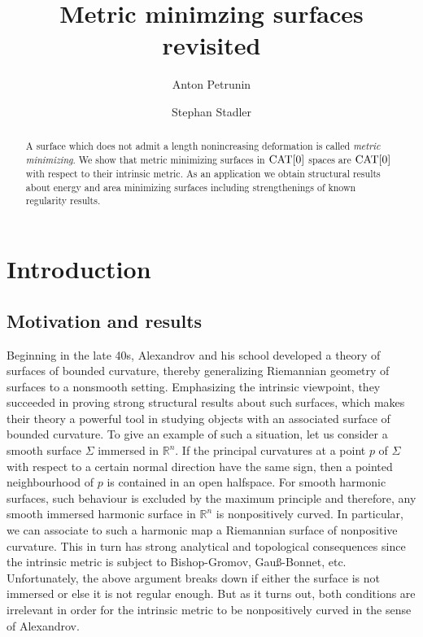 \documentclass[a4paper,10pt]{amsart}
\begin{document}
\title{Metric minimzing surfaces revisited}
\author{Anton Petrunin}
\address{A. Petrunin\newline\vskip-4mm
Math. Dept. PSU,
University Park, PA 16802,
USA}
\author{Stephan Stadler}
\address{S. Stadler\newline\vskip-4mm
Math. Inst.,
Universit\"at M\"unchen, Theresienstr. 39, D-80333 M\"unchen, Germany}


\date{}

\begin{abstract}
A surface which does not admit a length nonincreasing deformation is called \emph{metric minimizing}.
We show that metric minimizing surfaces in $\mathop{\rm CAT}\nolimits[0]$ spaces are $\mathop{\rm CAT}\nolimits[0]$ with respect to their intrinsic metric.
As an application we obtain structural results about energy and area minimizing surfaces including
strengthenings of known regularity results. 

\end{abstract}
\maketitle

\section{Introduction}


\subsection{Motivation and results}
Beginning in the late 40s, Alexandrov and his school developed a theory of surfaces of bounded curvature, thereby 
generalizing Riemannian geometry of surfaces to a nonsmooth setting. Emphasizing the intrinsic viewpoint, they succeeded
in proving strong structural results about such surfaces, which makes their theory a powerful tool in studying objects with an
associated surface of bounded curvature. To give an example of such a situation, let us consider a smooth surface $\Sigma$ immersed 
in $\mathbb{R}^n$.  
If the principal curvatures at a point $p$ of $\Sigma$ with respect to a certain normal direction have the same sign, then
a pointed neighbourhood of $p$ is contained in an open halfspace. For smooth harmonic surfaces, such behaviour is excluded
by the maximum principle and therefore, any smooth immersed harmonic surface in $\mathbb{R}^n$ is nonpositively curved.   
In particular, we can associate to such a harmonic map a Riemannian surface of nonpositive curvature. 
This in turn has strong analytical and topological consequences since the intrinsic metric is subject to Bishop-Gromov, Gau\ss-Bonnet, etc. 
Unfortunately, the above argument breaks down if either the surface is not immersed or else it is not regular enough.
But as it turns out, both conditions are irrelevant in order for the intrinsic metric to be nonpositively curved in the sense of Alexandrov.
\end{document}
